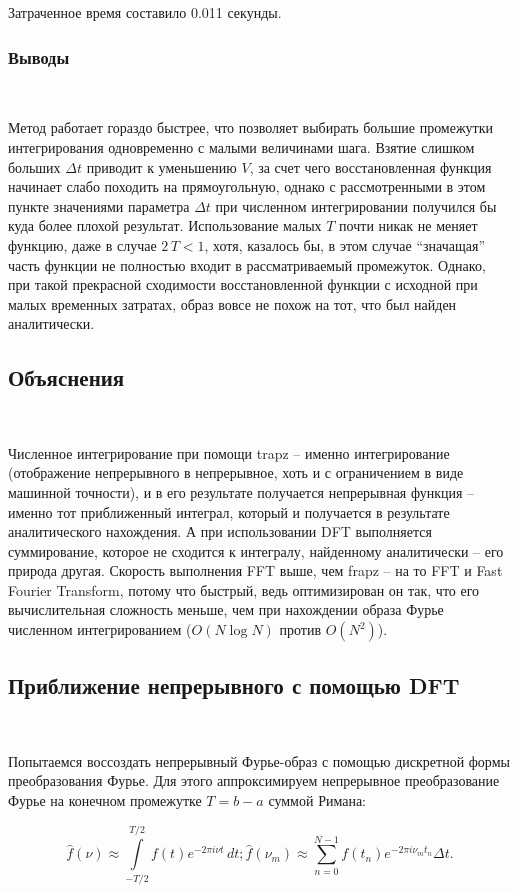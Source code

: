 \documentclass[a4paper]{article}
\let\oldint\int
\def\int{\oldint\limits}
\begin{document}
Затраченное время составило 0.011 секунды. 

\subsubsection{Выводы}\

Метод работает гораздо быстрее, что позволяет выбирать большие промежутки интегрирования одновременно с малыми величинами шага. Взятие слишком больших $\Delta t$ приводит к уменьшению $V$, за счет чего восстановленная функция начинает слабо походить на прямоугольную, однако с рассмотренными в этом пункте значениями параметра $\Delta t$ при численном интегрировании получился бы куда более плохой результат. Использование малых $T$ почти никак не меняет функцию, даже в случае $2\,T < 1$, хотя, казалось бы, в этом случае ``значащая'' часть функции не полностью входит в рассматриваемый промежуток. Однако, при такой прекрасной сходимости восстановленной функции с исходной при малых временных затратах, образ вовсе не похож на тот, что был найден аналитически.

\subsection{Объяснения}\

Численное интегрирование при помощи trapz -- именно интегрирование (отображение непрерывного в непрерывное, хоть и с ограничением в виде машинной точности), и в его результате получается непрерывная функция -- именно тот приближенный интеграл, который и получается в результате аналитического нахождения. А при использовании DFT выполняется суммирование, которое не сходится к интегралу, найденному аналитически -- его природа другая. Скорость выполнения FFT выше, чем frapz -- на то FFT и Fast Fourier Transform, потому что быстрый, ведь оптимизирован он так, что его вычислительная сложность меньше, чем при нахождении образа Фурье численном интегрированием ($O(N \log N)$ против $O(N^2)$).

\subsection{Приближение непрерывного с помощью DFT}\

Попытаемся воссоздать непрерывный Фурье-образ с помощью дискретной формы преобразования Фурье. Для этого аппроксимируем непрерывное преобразование Фурье на конечном промежутке $T = b - a$ суммой Римана:

$$
\hat{f}(\nu) \approx \int_{-T/2}^{T/2} f(t) e^{-2\pi i\nu t} \, dt; \hat{f}(\nu_m) \approx \sum_{n=0}^{N-1} f(t_n) e^{-2\pi i \nu_m t_n} \Delta t.
$$\ 
\end{document}

